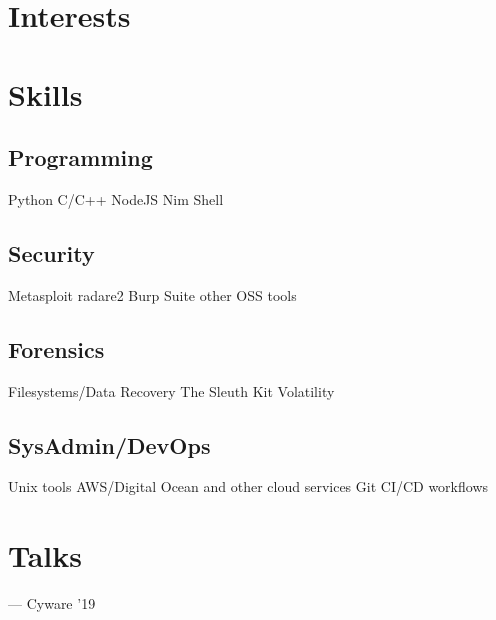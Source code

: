 \documentclass[]{resume-openfont}
\begin{document}
\begin{minipage}[t]{0.33\textwidth}
\section{Interests}
\sectionsep


\vspace{4mm} %

\section{Skills}
\subsection{Programming}
Python \textbullet{} C/C++ \textbullet{} NodeJS \textbullet{} Nim \textbullet{} Shell
\sectionsep
\subsection{Security}
Metasploit \textbullet{} radare2 \textbullet{} Burp Suite \textbullet{} other OSS tools
\sectionsep
\subsection{Forensics}
Filesystems/Data Recovery \textbullet{} The Sleuth Kit \textbullet{} Volatility
\sectionsep
\subsection{SysAdmin/DevOps}
Unix tools \textbullet{} AWS/Digital Ocean and other cloud services \textbullet{} Git \textbullet{} CI/CD workflows


\vspace{4mm} %
\section{Talks}
\href{https://github.com/icyphox/cyware19/raw/master/slides/Cyware RE Workshop.pdf}{\bf{}} — Cyware '19
%
%

\end{minipage} 
\end{document}
